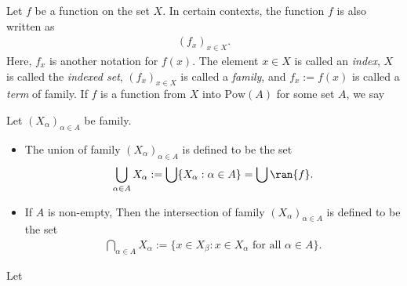 Let $f$ be a function on the set $X$. In certain contexts, the function $f$ is also written as
    \begin{align*}
        (f_x)_{x \in X}.
    \end{align*}
Here, $f_x$ is another notation for $f(x)$. The element $x \in X$ is called an \emph{index}, $X$ is called the \emph{indexed set}, $(f_x)_{x \in X}$ is called a \emph{family}, and $f_x := f(x)$ is called a \emph{term} of family. If $f$ is a function from $X$ into $\mathrm{Pow}(A)$ for some set $A$, we say 

\begin{definition}
    Let $(X_\alpha)_{\alpha \in A}$ be family.
    \begin{itemize}
        \item The union of family $(X_\alpha)_{\alpha \in A}$ is defined to be the set
        \begin{align*}
            \bigcup_{\alpha \in A}X_\alpha
            := \bigcup\{X_\alpha : \alpha \in A\}
            = \bigcup\ran{f}.
        \end{align*}
        \item If $A$ is non-empty, Then the intersection of family $(X_\alpha)_{\alpha \in A}$ is defined to be the set
        \begin{align*}
            \bigcap_{\alpha \in A}X_\alpha
            := \{x \in X_\beta : x \in X_\alpha \text{ for all } \alpha \in A\}.
        \end{align*}
    \end{itemize}
\end{definition}

\begin{proposition}
    Let $$
\end{proposition}


















